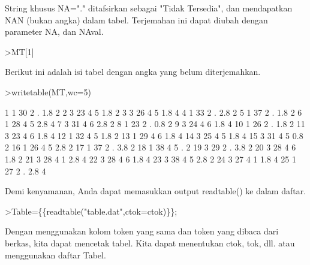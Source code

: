 \documentclass[a4paper,10pt]{article}
\begin{document}
\begin{eulernotebook}
\begin{eulercomment}
String khusus NA="." ditafsirkan sebagai "Tidak Tersedia", dan
mendapatkan NAN (bukan angka) dalam tabel. Terjemahan ini dapat diubah
dengan parameter NA, dan NAval.
\end{eulercomment}
\begin{eulerprompt}
>MT[1]
\end{eulerprompt}
\begin{euleroutput}
  [1,  1,  30,  2,  NAN,  1.8,  2]
\end{euleroutput}
\begin{eulercomment}
Berikut ini adalah isi tabel dengan angka yang belum diterjemahkan.
\end{eulercomment}
\begin{eulerprompt}
>writetable(MT,wc=5)
\end{eulerprompt}
\begin{euleroutput}
      1    1   30    2    .  1.8    2
      2    3   23    4    5  1.8    2
      3    3   26    4    5  1.8    4
      4    1   33    2    .  2.8    2
      5    1   37    2    .  1.8    2
      6    1   28    4    5  2.8    4
      7    3   31    4    6  2.8    2
      8    1   23    2    .  0.8    2
      9    3   24    4    6  1.8    4
     10    1   26    2    .  1.8    2
     11    3   23    4    6  1.8    4
     12    1   32    4    5  1.8    2
     13    1   29    4    6  1.8    4
     14    3   25    4    5  1.8    4
     15    3   31    4    5  0.8    2
     16    1   26    4    5  2.8    2
     17    1   37    2    .  3.8    2
     18    1   38    4    5    .    2
     19    3   29    2    .  3.8    2
     20    3   28    4    6  1.8    2
     21    3   28    4    1  2.8    4
     22    3   28    4    6  1.8    4
     23    3   38    4    5  2.8    2
     24    3   27    4    1  1.8    4
     25    1   27    2    .  2.8    4
\end{euleroutput}
\begin{eulercomment}
Demi kenyamanan, Anda dapat memasukkan output readtable() ke dalam
daftar.
\end{eulercomment}
\begin{eulerprompt}
>Table=\{\{readtable("table.dat",ctok=ctok)\}\};
\end{eulerprompt}
\begin{eulercomment}
Dengan menggunakan kolom token yang sama dan token yang dibaca dari
berkas, kita dapat mencetak tabel. Kita dapat menentukan ctok, tok,
dll. atau menggunakan daftar Tabel.
\end{eulercomment}
\begin{eulerprompt}

\end{eulerprompt}
\end{eulernotebook}
\end{document}
